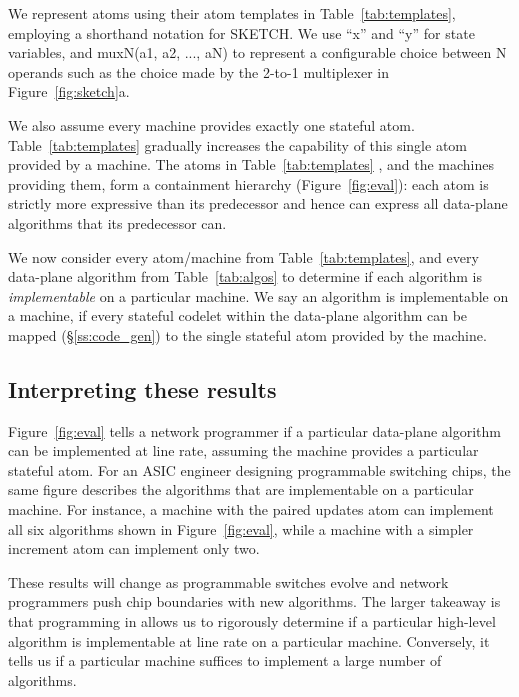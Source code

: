 We represent atoms using their atom templates in Table~\ref{tab:templates},
employing a shorthand notation for SKETCH. We use ``x'' and ``y'' for state
variables, and muxN(a1, a2, ..., aN) to represent a configurable choice between
N operands such as the choice made by the 2-to-1 multiplexer in
Figure~\ref{fig:sketch}a.

We also assume every \absmachine machine provides exactly one stateful atom.
Table~\ref{tab:templates} gradually increases the capability of this single
atom provided by a \absmachine machine.  The atoms in Table~\ref{tab:templates}
, and the \absmachine machines providing them, form a containment hierarchy
(Figure~\ref{fig:eval}): each atom is strictly more expressive than its
predecessor and hence can express all data-plane algorithms that its
predecessor can.

We now consider every atom/\absmachine machine from Table~\ref{tab:templates},
and every data-plane algorithm from Table~\ref{tab:algos} to determine if each
algorithm is \textit{implementable} on a particular \absmachine machine. We
say an algorithm is implementable on a \absmachine machine, if every stateful
codelet within the data-plane algorithm can be mapped (\S\ref{ss:code_gen}) to
the single stateful atom provided by the \absmachine machine.

\subsection{Interpreting these results}
Figure~\ref{fig:eval} tells a network programmer if a particular data-plane
algorithm can be implemented at line rate, assuming the \absmachine machine
provides a particular stateful atom. For an ASIC engineer designing
programmable switching chips, the same figure describes the algorithms that are
implementable on a particular \absmachine machine. For instance, a \absmachine
machine with the paired updates atom can implement all six algorithms shown in
Figure~\ref{fig:eval}, while a machine with a simpler increment atom can
implement only two.

These results will change as programmable switches evolve and network
programmers push chip boundaries with new algorithms.  The larger takeaway is
that programming in \pktlanguage allows us to rigorously determine if a
particular high-level algorithm is implementable at line rate on a particular
\absmachine machine. Conversely, it tells us if a particular \absmachine
machine suffices to implement a large number of algorithms.
